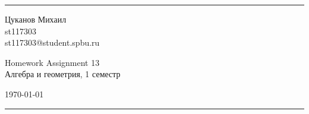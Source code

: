 \documentclass[a4paper, 12pt]{article}
\begin{document}

\fancyhead[C]{}
\hrule \medskip %
\begin{minipage}{0.295\textwidth}
\raggedright\footnotesize
Цуканов Михаил \hfill\\
st117303 \hfill\\
st117303@student.spbu.ru
\end{minipage}
\begin{minipage}{0.4\textwidth}
\centering\large
Homework Assignment 13\\
\normalsize
Алгебра и геометрия, 1 семестр\\
\end{minipage}
\begin{minipage}{0.295\textwidth}
\raggedleft
\today\hfill\\
\end{minipage}
\medskip\hrule
\bigskip

\end{document}
